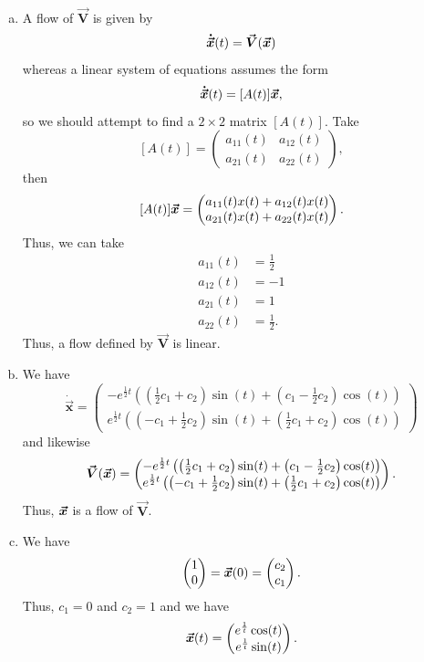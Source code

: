 \documentclass[12pt]{article} %
\newcommand{\vecxdot}{\boldsymbol{\dot{\vec{x}}}}
\newcommand{\vecfieldV}{\boldsymbol{\vec{V}}}
\begin{document}
\begin{solution}~
\begin{enumerate}[(a)]
    \item A flow of $\vecfieldV$ is given by
    \[
    \vecxdot(t) = \vecfieldV(\vecx)
    \]
    whereas a linear system of equations assumes the form
    \[
    \vecxdot(t) = [A(t)] \vecx,
    \]
    so we should attempt to find a $2\times 2$ matrix $[A(t)]$. Take
    \[
    [A(t)] = \begin{pmatrix} a_{11}(t) & a_{12}(t) \\ a_{21}(t) & a_{22}(t) \end{pmatrix},
    \]
    then
    \[
[A(t)] \boldsymbol{\vec{x}} = \begin{pmatrix} a_{11}(t) x(t) + a_{12}(t) x(t) \\ a_{21}(t) x(t) + a_{22}(t) x(t) \end{pmatrix}.   
    \]
Thus, we can take 
\begin{align*}
a_{11}(t) &= \frac{1}{2} \\
a_{12}(t) &= -1 \\
a_{21}(t) &= 1\\
a_{22}(t) &= \frac{1}{2}.
\end{align*}
Thus, a flow defined by $\vecfieldV$ is linear.

\item We have
\[
\vecxdot = \begin{pmatrix} -e^{\frac{1}{2} t}\left( \left(\frac{1}{2} c_1 + c_2\right) \sin(t) + \left(c_1-\frac{1}{2}c_2\right) \cos(t)\right) \\ e^{\frac{1}{2} t}\left( \left(-c_1 +\frac{1}{2} c_2\right) \sin(t) + \left(\frac{1}{2}c_1+c_2\right) \cos(t)\right) \end{pmatrix}
\]
and likewise
\[
\vecfieldV(\vecx) = \begin{pmatrix} -e^{\frac{1}{2} t}\left( \left(\frac{1}{2} c_1 + c_2\right) \sin(t) + \left(c_1-\frac{1}{2}c_2\right) \cos(t)\right) \\ e^{\frac{1}{2} t}\left( \left(-c_1 +\frac{1}{2} c_2\right) \sin(t) + \left(\frac{1}{2}c_1+c_2\right) \cos(t)\right) \end{pmatrix}.
\]
Thus, $\boldsymbol{\vec{x}}$ is a flow of $\vecfieldV$.

\item We have
\[
\begin{pmatrix} 1 \\ 0 \end{pmatrix} = \boldsymbol{\vec{x}}(0) = \begin{pmatrix} c_2 \\ c_1 \end{pmatrix}.
\]
Thus, $c_1=0$ and $c_2=1$ and we have
\[
\boldsymbol{\vec{x}}(t) = \begin{pmatrix} e^{\frac{1}{t}} \cos(t) \\ e^{\frac{1}{t}} \sin(t) \end{pmatrix}.
\]


\end{enumerate}
\end{solution}
\end{document}
